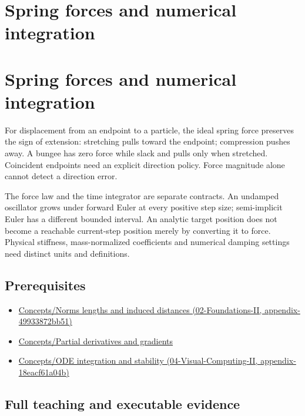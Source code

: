 \hypertarget{appendix-e040e2108923}{}
\section*{Spring forces and numerical integration}
\section{Spring forces and numerical integration}\label{spring-forces-and-numerical-integration}

For displacement from an endpoint to a particle, the ideal spring force preserves the sign of extension: stretching pulls toward the endpoint; compression pushes away. A bungee has zero force while slack and pulls only when stretched. Coincident endpoints need an explicit direction policy. Force magnitude alone cannot detect a direction error.

The force law and the time integrator are separate contracts. An undamped oscillator grows under forward Euler at every positive step size; semi-implicit Euler has a different bounded interval. An analytic target position does not become a reachable current-step position merely by converting it to force. Physical stiffness, mass-normalized coefficients and numerical damping settings need distinct units and definitions.

\subsection{Prerequisites}\label{prerequisites}

\begin{itemize}
\tightlist
\item
  \href{}{Concepts/Norms lengths and induced distances (02-Foundations-II, appendix-49933872bb51)}
\item
  \hyperref[appendix-677b59746ae0]{Concepts/Partial derivatives and gradients}
\item
  \href{}{Concepts/ODE integration and stability (04-Visual-Computing-II, appendix-18eacf61a04b)}
\end{itemize}

\subsection{Full teaching and executable evidence}\label{full-teaching-and-executable-evidence}

